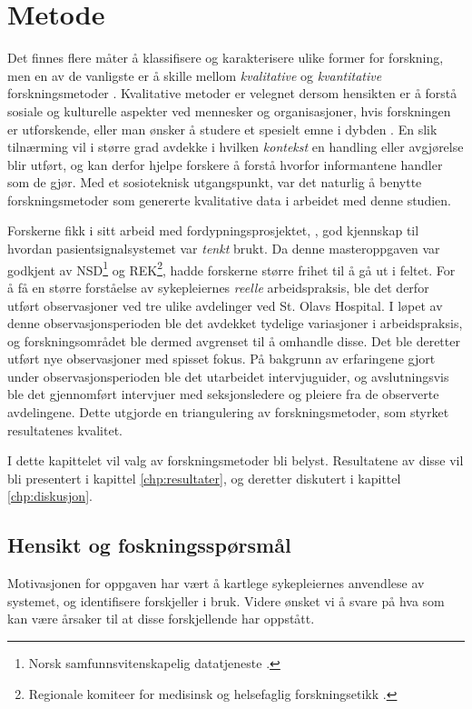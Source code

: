 \chapter{Metode}
\label{chp:metode} 

Det finnes flere måter å klassifisere og karakterisere ulike former for forskning, men en av de vanligste er å skille mellom \textit{kvalitative} og \textit{kvantitative} forskningsmetoder \citep{Myers13, Tjora}. Kvalitative metoder er velegnet dersom hensikten er å forstå sosiale og kulturelle aspekter ved mennesker og organisasjoner, hvis forskningen er utforskende, eller man ønsker å studere et spesielt emne i dybden \citep{Myers13}. En slik tilnærming vil i større grad avdekke i hvilken \textit{kontekst} en handling eller avgjørelse blir utført, og kan derfor hjelpe forskere å forstå hvorfor informantene handler som de gjør. Med et sosioteknisk utgangspunkt, var det naturlig å benytte forskningsmetoder som genererte kvalitative data i arbeidet med denne studien.

\noindent
Forskerne fikk i sitt arbeid med fordypningsprosjektet, \citet{Sund13}, god kjennskap til hvordan pasientsignalsystemet var \textit{tenkt} brukt. Da denne masteroppgaven var godkjent av NSD\footnote{Norsk samfunnsvitenskapelig datatjeneste \citep{NSD}.} og REK\footnote{Regionale komiteer for medisinsk og helsefaglig forskningsetikk \citep{REK}.}, hadde forskerne større frihet til å gå ut i feltet. For å få en større forståelse av sykepleiernes \textit{reelle} arbeidspraksis, ble det derfor utført observasjoner ved tre ulike avdelinger ved St. Olavs Hospital. I løpet av denne observasjonsperioden ble det avdekket tydelige variasjoner i arbeidspraksis, og forskningsområdet ble dermed avgrenset til å omhandle disse. Det ble deretter utført nye observasjoner med spisset fokus. På bakgrunn av erfaringene gjort under observasjonsperioden ble det utarbeidet intervjuguider, og avslutningsvis ble det gjennomført intervjuer med seksjonsledere og pleiere fra de observerte avdelingene. Dette utgjorde en triangulering av forskningsmetoder, som styrket resultatenes kvalitet.

\noindent
I dette kapittelet vil valg av forskningsmetoder bli belyst. Resultatene av disse vil bli presentert i kapittel \ref{chp:resultater}, og deretter diskutert i kapittel \ref{chp:diskusjon}. 


\section{Hensikt og foskningsspørsmål}
Motivasjonen for oppgaven har vært å kartlege sykepleiernes anvendlese av systemet, og identifisere forskjeller i bruk. Videre ønsket vi å svare på hva som kan være årsaker til at disse forskjellende har oppstått. 

